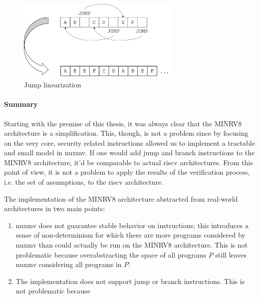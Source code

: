 \begin{figure}
    \centering
    \includegraphics[width=0.7\textwidth]{figures/jump-free-programs.png}
    \caption{Jump linearization}
    \label{fig:jump-inlining}
\end{figure}

\paragraph{Summary}

Starting with the premise of this thesis, it was always clear that the MINRV8 architecture is a simplification.
This, though, is not a problem since by focusing on the very core, security related instructions allowed us to implement a tractable and small model in \gls{nuxmv}.
If one would add jump and branch instructions to the MINRV8 architecture, it'd be comparable to actual \gls{riscv} architectures.
From this point of view, it is not a problem to apply the results of the verification process, i.e. the set of assumptions, to the \gls{riscv} architecture.

The implementation of the MINRV8 architecture abstracted from real-world architectures in two main points:
\begin{enumerate}
    \item \gls{nuxmv} does not guarantee stable behavior on  instructions; this introduces a sense of non-determinism for which there are more programs considered by \gls{nuxmv} than could actually be run on the MINRV8 architecture.
    This is not problematic because overabstracting the space of all programs $ P $ still leaves \gls{nuxmv} considering all programs in $ P $.
    \item The implementation does not support jump or branch instructions.
    This is not problematic because
\end{enumerate}

